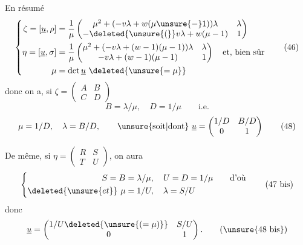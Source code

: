 En résumé
\[
\left\{\begin{aligned}
\zeta=[\underline u,\rho]
&=\frac1\mu\begin{pmatrix}
\mu^2+(-v\lambda+w(\mu\unsure{-}1))\lambda&\lambda\\
-\deleted{\unsure{(}}v\lambda+w(\mu-1)&1
\end{pmatrix}\\
\eta=[\underline u,\sigma]
&=\frac1\mu\begin{pmatrix}
\mu^2+(-v\lambda+(w-1)(\mu-1))\lambda&\lambda\\
-v\lambda+(w-1)(\mu-1)&1
\end{pmatrix}\quad\text{et, bien sûr}\\
\mu&=\det\underline u\ \deleted{\unsure{=\mu}}
\end{aligned}\right. \tag{46}
\]
donc on a, si $\zeta=\begin{pmatrix}A&B\\C&D\end{pmatrix}$
\[
B=\lambda/\mu,\quad D=1/\mu\qquad\text{i.e.} \tag{47}
\]
\[
\mu=1/D,\quad\lambda=B/D,\qquad\text{\unsure{soit|dont} }\underline u=\begin{pmatrix}1/D&B/D\\0&1\end{pmatrix} \tag{48}
\]


De même, si $\eta=\begin{pmatrix}R&S\\T&U\end{pmatrix}$, on aura 
\[
\left\{\begin{aligned}
S=B&=\lambda/\mu,\quad U=D=1/\mu\qquad\text{d'où}\\
\deleted{\unsure{et}}\ \mu&=1/U,\quad\lambda=S/U
\end{aligned}\right. \tag{47 bis}
\]
donc
\[
\underline u=\begin{pmatrix}1/U\deleted{\unsure{(=\mu)}}&S/U\\0&1\end{pmatrix}. \tag{\unsure{48 bis}}
\]


